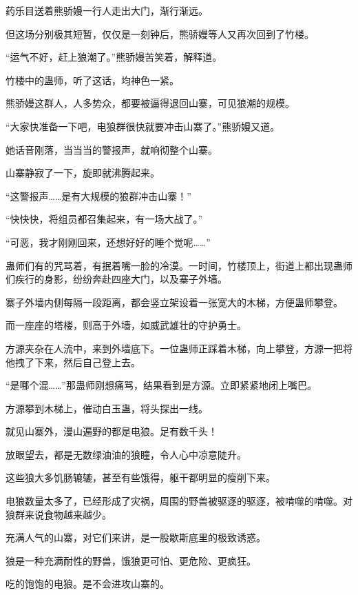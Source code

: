 
\begin{this_body}



药乐目送着熊骄嫚一行人走出大门，渐行渐远。

但这场分别极其短暂，仅仅是一刻钟后，熊骄嫚等人又再次回到了竹楼。

“运气不好，赶上狼潮了。”熊骄嫚苦笑着，解释道。

竹楼中的蛊师，听了这话，均神色一紧。

熊骄嫚这群人，人多势众，都要被逼得退回山寨，可见狼潮的规模。

“大家快准备一下吧，电狼群很快就要冲击山寨了。”熊骄嫚又道。

她话音刚落，当当当的警报声，就响彻整个山寨。

山寨静寂了一下，旋即就沸腾起来。

“这警报声……是有大规模的狼群冲击山寨！”

“快快快，将组员都召集起来，有一场大战了。”

“可恶，我才刚刚回来，还想好好的睡个觉呢……”

蛊师们有的咒骂着，有抿着嘴一脸的冷漠。一时间，竹楼顶上，街道上都出现蛊师们疾行的身影，纷纷奔赴四座大门，以及寨子外墙。

寨子外墙内侧每隔一段距离，都会竖立架设着一张宽大的木梯，方便蛊师攀登。

而一座座的塔楼，则高于外墙，如威武雄壮的守护勇士。

方源夹杂在人流中，来到外墙底下。一位蛊师正踩着木梯，向上攀登，方源一把将他拽了下来，然后自己登上去。

“是哪个混……”那蛊师刚想痛骂，结果看到是方源。立即紧紧地闭上嘴巴。

方源攀到木梯上，催动白玉蛊，将头探出一线。

就见山寨外，漫山遍野的都是电狼。足有数千头！

放眼望去，都是无数绿油油的狼瞳，令人心中凉意陡升。

这些狼大多饥肠辘辘，甚至有些饿得，躯干都明显的瘦削下来。

电狼数量太多了，已经形成了灾祸，周围的野兽被驱逐的驱逐，被啃噬的啃噬。对狼群来说食物越来越少。

充满人气的山寨，对它们来讲，是一股歇斯底里的极致诱惑。

狼是一种充满耐性的野兽，饿狼更可怕、更危险、更疯狂。

吃的饱饱的电狼。是不会进攻山寨的。


\end{this_body}
